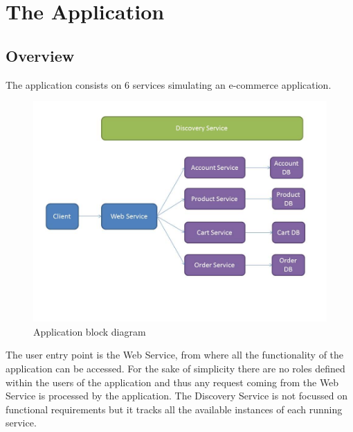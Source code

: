 
\chapter{The Application} %

\label{Chapter1} %


\newcommand{\keyword}[1]{\textbf{#1}}
\newcommand{\tabhead}[1]{\textbf{#1}}
\newcommand{\code}[1]{\texttt{#1}}
\newcommand{\file}[1]{\texttt{\bfseries#1}}
\newcommand{\option}[1]{\texttt{\itshape#1}}


\section{Overview}
The application consists on 6 services simulating an e-commerce application.

\begin{figure}
\centering
\includegraphics[width=\textwidth,height=\textheight,keepaspectratio]{Figures/Presentation1}
\decoRule
\caption[Block Diagram]{Application block diagram}
\label{fig:Block Diagram}
\end{figure}

The user entry point is the Web Service, from where all the functionality of the application can be accessed. For the sake of simplicity there are no roles defined within the users of the application and thus any request coming from the Web Service is processed by the application.
The Discovery Service is not focussed on functional requirements but it tracks all the available instances of each running service.

